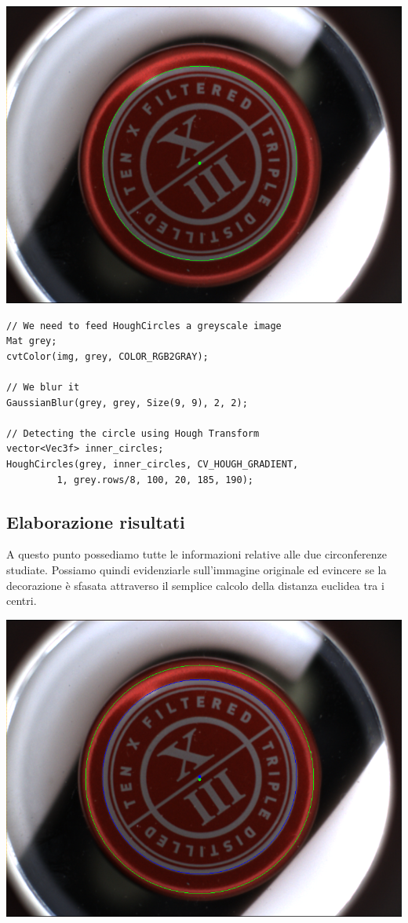 \vspace{1cm}

\begin{centering}
\includegraphics[width=\textwidth]{img/finale2.png}
\end{centering}
\newpage
\begin{lstlisting}
// We need to feed HoughCircles a greyscale image
Mat grey;
cvtColor(img, grey, COLOR_RGB2GRAY);

// We blur it
GaussianBlur(grey, grey, Size(9, 9), 2, 2);

// Detecting the circle using Hough Transform
vector<Vec3f> inner_circles;
HoughCircles(grey, inner_circles, CV_HOUGH_GRADIENT,
		 1, grey.rows/8, 100, 20, 185, 190);
\end{lstlisting}

\subsection{Elaborazione risultati}

A questo punto possediamo tutte le informazioni relative alle due circonferenze studiate. Possiamo quindi evidenziarle sull’immagine originale ed evincere se la decorazione è sfasata attraverso il semplice calcolo della distanza euclidea tra i centri.

\vspace{1cm}

\begin{centering}
\includegraphics[width=\textwidth]{img/finaleTOT.png}
\end{centering}
